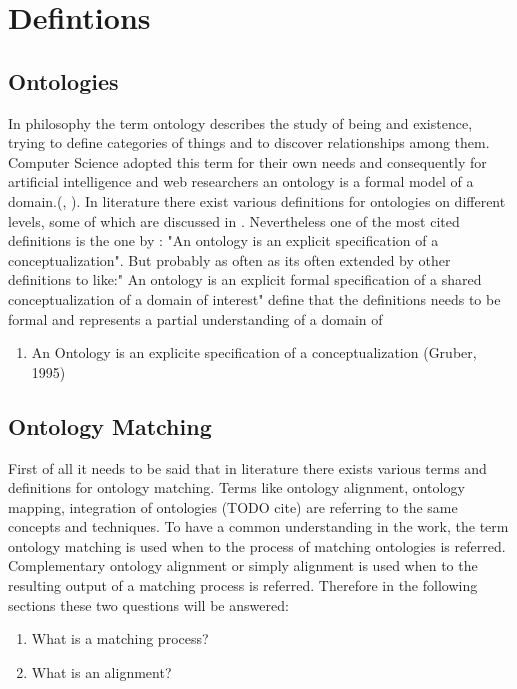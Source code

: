 \documentclass[11pt,titlepage,oneside,openany,a4paper]{report}
\begin{document}
	\section{Defintions}
	\label{sec:defintions}

	\subsection{Ontologies}
	\label{sec:ontologies_def}
In philosophy the term ontology describes the study of being and existence, trying to define categories of things and to discover relationships among them. Computer Science adopted this term for their own needs and consequently for artificial intelligence  and web researchers an ontology is a formal model of a domain.(\cite{ehrig2006ontology}, \cite{paulheim2011ontology}). 
In literature there exist various definitions for ontologies on different levels, some of which are discussed in \cite{Guarino:1997}. Nevertheless one of the most cited definitions is the one by \cite{Gruber:1995}: "An ontology is an explicit specification  of a conceptualization".  But probably as often as its often extended by other definitions to like:" An ontology is an explicit formal specification of a shared conceptualization of a domain of interest" define that the definitions needs to be formal and represents  a partial understanding of a domain of 
	\begin{enumerate}
	\item An Ontology is an explicite specification of a conceptualization (Gruber, 1995)
	\end{enumerate}
	\subsection{Ontology Matching}
	\label{sec:ontologymatching_def}
	First of all it  needs to be said that in literature there exists various terms and definitions for ontology matching. Terms like ontology alignment, ontology mapping, integration of ontologies (TODO cite) are referring to the same concepts and techniques. To have a common understanding in the work, the term ontology matching is used when to the process of matching ontologies is referred. Complementary ontology alignment or simply alignment is used when to the resulting output of a matching process is referred. Therefore in the following sections these two questions will be answered:
	
\begin{enumerate}
\item What is a matching process?
\item What is an alignment?
\end{enumerate}
\end{document}

